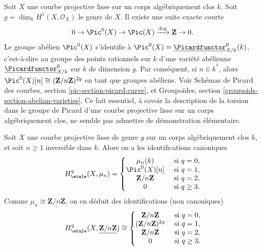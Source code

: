 \medskip\noindent
Soit $X$ une courbe projective lisse sur un corps algébriquement clos $k$.
Soit $g = \dim_k H^1(X, \mathcal{O}_X)$ le genre de $X$.
Il existe une suite exacte courte
$$
0 \to \Pic^0(X) \to \Pic(X) \xrightarrow{\deg} \mathbf{Z} \to 0.
$$
Le groupe abélien $\Pic^0(X)$ s'identifie à
$\Pic^0(X) = \underline{\Picardfunctor}^0_{X/k}(k)$, c'est-à-dire
au groupe des points rationnels sur $k$ d'une variété abélienne
$\underline{\Picardfunctor}^0_{X/k}$ sur $k$ de dimension $g$.
Par conséquent, si $n \in k^*$, alors
$\Pic^0(X)[n] \cong (\mathbf{Z}/n\mathbf{Z})^{2g}$
en tant que groupes abéliens. Voir
Schémas de Picard des courbes, section \ref{pic-section-picard-curve},
et
Groupoïdes, section \ref{groupoids-section-abelian-varieties}.
Ce fait essentiel, à savoir la description de la torsion dans le
groupe de Picard d'une courbe projective lisse sur un corps
algébriquement clos, ne semble pas admettre de démonstration élémentaire.

\begin{lemma}
\label{lemma-cohomology-smooth-projective-curve}
Soit $X$ une courbe projective lisse de genre $g$ sur un
corps algébriquement clos $k$, et soit $n \geq 1$ inversible dans $k$.
Alors on a les identifications canoniques
$$
H_\etale^q(X, \mu_n) =
\left\{
\begin{matrix}
\mu_n(k) & \text{ si }q = 0, \\
\Pic^0(X)[n] & \text{ si }q = 1, \\
\mathbf{Z}/n\mathbf{Z} & \text{ si }q = 2, \\
0 & \text{ si }q \geq 3.
\end{matrix}
\right.
$$
Comme $\mu_n \cong \underline{\mathbf{Z}/n\mathbf{Z}}$, on en déduit des
identifications (non canoniques)
$$
H_\etale^q(X, \underline{\mathbf{Z}/n\mathbf{Z}}) \cong
\left\{
\begin{matrix}
\mathbf{Z}/n\mathbf{Z} & \text{ si }q = 0, \\
(\mathbf{Z}/n\mathbf{Z})^{2g} & \text{ si }q = 1, \\
\mathbf{Z}/n\mathbf{Z} & \text{ si }q = 2, \\
0 & \text{ si }q \geq 3.
\end{matrix}
\right.
$$
\end{lemma}


